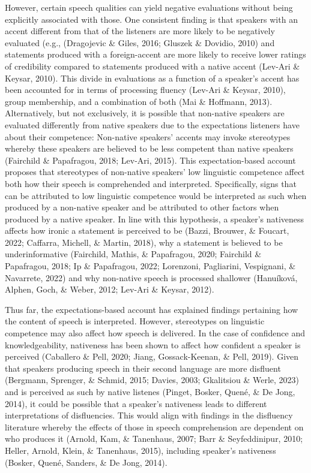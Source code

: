 \documentclass[
  man,floatsintext]{apa6}
\begin{document}
However, certain speech qualities can yield negative evaluations without being explicitly associated with those. One consistent finding is that speakers with an accent different from that of the listeners are more likely to be negatively evaluated (e.g., (Dragojevic \& Giles, 2016; Gluszek \& Dovidio, 2010) and statements produced with a foreign-accent are more likely to receive lower ratings of credibility compared to statements produced with a native accent (Lev-Ari \& Keysar, 2010). This divide in evaluations as a function of a speaker's accent has been accounted for in terms of processing fluency (Lev-Ari \& Keysar, 2010), group membership, and a combination of both (Mai \& Hoffmann, 2013). Alternatively, but not exclusively, it is possible that non-native speakers are evaluated differently from native speakers due to the expectations listeners have about their competence: Non-native speakers' accents may invoke stereotypes whereby these speakers are believed to be less competent than native speakers (Fairchild \& Papafragou, 2018; Lev-Ari, 2015). This expectation-based account proposes that stereotypes of non-native speakers' low linguistic competence affect both how their speech is comprehended and interpreted. Specifically, signs that can be attributed to low linguistic competence would be interpreted as such when produced by a non-native speaker and be attributed to other factors when produced by a native speaker. In line with this hypothesis, a speaker's nativeness affects how ironic a statement is perceived to be (Bazzi, Brouwer, \& Foucart, 2022; Caffarra, Michell, \& Martin, 2018), why a statement is believed to be underinformative (Fairchild, Mathis, \& Papafragou, 2020; Fairchild \& Papafragou, 2018; Ip \& Papafragou, 2022; Lorenzoni, Pagliarini, Vespignani, \& Navarrete, 2022) and why non-native speech is processed shallower (Hanuíková, Alphen, Goch, \& Weber, 2012; Lev-Ari \& Keysar, 2012).

Thus far, the expectations-based account has explained findings pertaining how the content of speech is interpreted. However, stereotypes on linguistic competence may also affect how speech is delivered. In the case of confidence and knowledgeability, nativeness has been shown to affect how confident a speaker is perceived (Caballero \& Pell, 2020; Jiang, Gossack-Keenan, \& Pell, 2019). Given that speakers producing speech in their second language are more disfluent (Bergmann, Sprenger, \& Schmid, 2015; Davies, 2003; Gkalitsiou \& Werle, 2023) and is perceived as such by native listenes (Pinget, Bosker, Quené, \& De Jong, 2014), it could be possible that a speaker's nativeness leads to different interpretations of disfluencies. This would align with findings in the disfluency literature whereby the effects of those in speech comprehension are dependent on who produces it (Arnold, Kam, \& Tanenhaus, 2007; Barr \& Seyfeddinipur, 2010; Heller, Arnold, Klein, \& Tanenhaus, 2015), including speaker's nativeness (Bosker, Quené, Sanders, \& De Jong, 2014).
\end{document}
